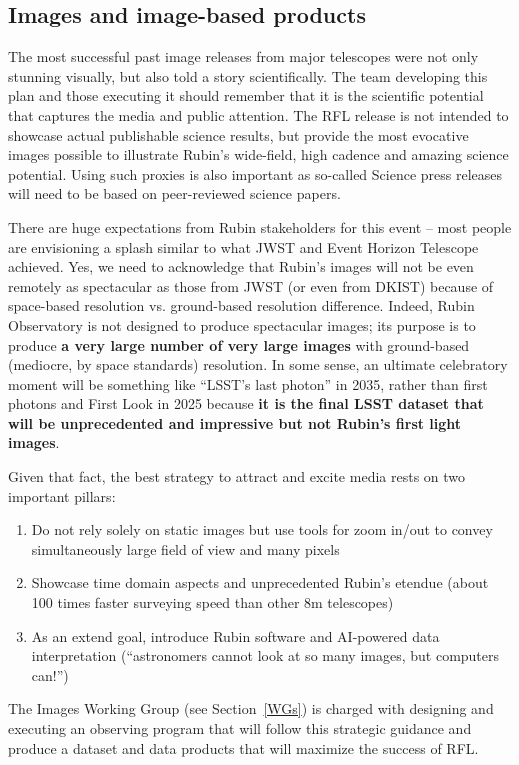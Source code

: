 \subsection{Images and image-based products}

The most successful past image releases from major telescopes were not only stunning visually, but also told a story scientifically. The team developing this plan and those executing it should remember that it is the scientific potential that captures the media and public attention. The RFL release is not intended to showcase actual publishable science results, but provide the most evocative images possible to illustrate Rubin’s wide-field, high cadence and amazing science potential. Using such proxies is also important as so-called Science press releases will need to be based on peer-reviewed science papers.


There are huge expectations from Rubin stakeholders for this event -- most people are envisioning a splash similar to what JWST and Event Horizon Telescope achieved. Yes, we need to acknowledge that Rubin’s images will not be even remotely as spectacular as those from
JWST (or even from DKIST) because of space-based resolution vs. ground-based resolution difference. Indeed, Rubin Observatory is not designed to produce spectacular images; its purpose is to produce {\bf a very large number of very large 
images} with ground-based (mediocre, by space standards) resolution. In some sense, an ultimate celebratory moment 
will be something like ``LSST’s last photon'' in 2035, rather than first photons and First Look in 2025 because
{\bf it is the final LSST dataset that will be unprecedented and impressive but not Rubin's first light images}. 

Given that fact, the best strategy to attract and excite media rests on two important pillars:
\begin{enumerate} 
\item Do not rely solely on static images but use tools for zoom in/out to convey simultaneously large field of view and many pixels 
\item Showcase time domain aspects and unprecedented Rubin's etendue (about 100 times faster surveying speed than other 8m telescopes) 
\item As an extend goal, introduce Rubin software and AI-powered data interpretation (``astronomers cannot look at so many images, but computers can!'')
\end{enumerate}

The Images Working Group (see Section~\ref{WGs}) is charged with designing and executing an observing
program that will follow this strategic guidance and produce a dataset and data products that will
maximize the success of RFL. 

